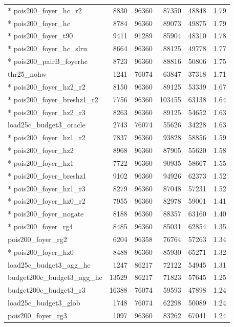 \documentclass[10pt]{article}
\begin{document}
\begin{center}
\begin{tabular}{lrrrrr}
* pois200\_foyer\_hc\_r2 & 8830 & 96360 & 87350 & 48848 & 1.79 \\
* pois200\_foyer\_hc & 8784 & 96360 & 89073 & 49875 & 1.79 \\
* pois200\_foyer\_t90 & 9411 & 91289 & 85904 & 48310 & 1.78 \\
* pois200\_foyer\_hc\_slru & 8664 & 96360 & 88125 & 49778 & 1.77 \\
* pois200\_pairB\_foyerhc & 8723 & 96360 & 88816 & 50806 & 1.75 \\
thr25\_nohw & 1241 & 76074 & 63847 & 37318 & 1.71 \\
* pois200\_foyer\_hz2\_r2 & 8150 & 96360 & 89125 & 53339 & 1.67 \\
* pois200\_foyer\_breshz1\_r2 & 7756 & 96360 & 103455 & 63138 & 1.64 \\
* pois200\_foyer\_hz2\_r3 & 8263 & 96360 & 89125 & 54652 & 1.63 \\
load25c\_budget3\_oracle & 2743 & 76074 & 55626 & 34228 & 1.63 \\
* pois200\_foyer\_hz1\_r2 & 7837 & 96360 & 93828 & 58856 & 1.59 \\
* pois200\_foyer\_hz2 & 8968 & 96360 & 87905 & 55620 & 1.58 \\
* pois200\_foyer\_hz1 & 7722 & 96360 & 90935 & 58667 & 1.55 \\
* pois200\_foyer\_breshz1 & 9102 & 96360 & 94926 & 62373 & 1.52 \\
* pois200\_foyer\_hz1\_r3 & 8279 & 96360 & 87048 & 57231 & 1.52 \\
* pois200\_foyer\_hz0\_r2 & 7955 & 96360 & 82978 & 59001 & 1.41 \\
* pois200\_foyer\_nogate & 8188 & 96360 & 88357 & 63160 & 1.40 \\
* pois200\_foyer\_rg4 & 8485 & 96360 & 85031 & 62854 & 1.35 \\
pois200\_foyer\_rg2 & 6204 & 96358 & 76764 & 57263 & 1.34 \\
* pois200\_foyer\_hz0 & 8488 & 96360 & 85930 & 65271 & 1.32 \\
load25c\_budget3\_agg\_hc & 1247 & 86217 & 72122 & 54945 & 1.31 \\
budget200c\_budget3\_agg\_hc & 13529 & 86217 & 71823 & 57645 & 1.25 \\
budget200c\_budget3\_r3 & 16388 & 76074 & 59593 & 47898 & 1.24 \\
load25c\_budget3\_glob & 1748 & 76074 & 62298 & 50089 & 1.24 \\
pois200\_foyer\_rg3 & 1097 & 96360 & 83262 & 67041 & 1.24 \\

\end{tabular}
\end{center}
\end{document}
